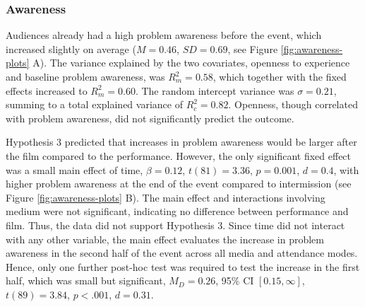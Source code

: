 \documentclass[
  man,floatsintext]{apa6}
\begin{document}
\subsubsection{Awareness}\label{awareness}

Audiences already had a high problem awareness before the event, which increased slightly on average (\(M = 0.46\), \(SD = 0.69\), see Figure \ref{fig:awareness-plots} A). The variance explained by the two covariates, openness to experience and baseline problem awareness, was \(R_{m}^2 = 0.58\), which together with the fixed effects increased to \(R_{m}^2 = 0.60\). The random intercept variance was \(\sigma = 0.21\), summing to a total explained variance of \(R_{c}^2 = 0.82\). Openness, though correlated with problem awareness, did not significantly predict the outcome.

Hypothesis 3 predicted that increases in problem awareness would be larger after the film compared to the performance. However, the only significant fixed effect was a small main effect of time, \(\beta = 0.12\), \(t (81) = 3.36\), \(p = 0.001\), \(d = 0.4\), with higher problem awareness at the end of the event compared to intermission (see Figure \ref{fig:awareness-plots} B). The main effect and interactions involving medium were not significant, indicating no difference between performance and film. Thus, the data did not support Hypothesis 3. Since time did not interact with any other variable, the main effect evaluates the increase in problem awareness in the second half of the event across all media and attendance modes. Hence, only one further post-hoc test was required to test the increase in the first half, which was small but significant, \(M_D = 0.26\), 95\% CI \([0.15, \infty]\), \(t(89) = 3.84\), \(p < .001\), \(d = 0.31\).
\end{document}
